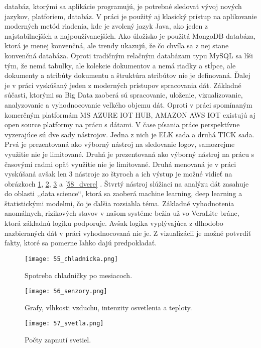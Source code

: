 databáz, ktorými sa aplikácie programujú, je potrebné sledovať vývoj nových jazykov, platforiem, databáz. V práci je použitý aj klasický prístup na aplikovanie moderných metód riadenia, kde je zvolený jazyk Java, ako jeden z najstabilnejších a najpoužívanejších. Ako úložisko je použitá MongoDB databáza, ktorá je menej konvenčná, ale trendy ukazujú, že čo chvíľa sa z nej stane konvenčná  databáza. Oproti tradičným relačným databázam typu MySQL sa líši tým, že nemá tabuľky, ale kolekcie dokumentov a nemá riadky a stĺpce, ale dokumenty a atribúty dokumentu a štruktúra atribútov nie je definovaná. Ďalej je v práci vyskúšaný jeden z moderných prístupov spracovania dát. Základné súčasti, ktorými sa Big Data zaoberá sú spracovanie, uloženie, vizualizovanie, analyzovanie a vyhodnocovanie veľkého objemu dát. Oproti v práci spomínaným komerčným platformám MS AZURE IOT HUB, AMAZON AWS IOT existujú aj open source platformy na prácu s dátami. V čase písania práce perspektívne vyzerajúce sú dve sady nástrojov. Jedna z nich je ELK \cite{IOT34} sada a druhá TICK \cite{IOT33} sada. Prvá je prezentovaná ako výborný nástroj na sledovanie logov, samozrejme využitie nie je limitované. Druhá je prezentovaná ako výborný nástroj na prácu s časovými radmi opäť využitie nie je limitované. Druhá menovaná je v práci vyskúšaná avšak len 3 nástroje zo štyroch a ich výstup je možné vidieť na obrázkoch \ref{55_chladnicka}, \ref{56_senzory}, \ref{57_svetla} a \ref{58_dvere} . Štvrtý nástroj slúžiaci na analýzu dát zasahuje do oblasti ,,data science``, ktorá sa zaoberá machine learning, deep learning a štatistickými modelmi, čo je ďalšia rozsiahla téma. Základné vyhodnotenia anomálnych, rizikových stavov v našom systéme bežia už vo VeraLite bráne, ktorá základnú logiku podporuje. Avšak logika vyplývajúca z dlhodobo nazbieraných dát v práci vyhodnocovaná nie je. Z vizualizácii je možné potvrdiť fakty, ktoré sa pomerne ľahko dajú predpokladať.

\begin{figure}[!htbp]
\centering
\texttt{[image: 55\_chladnicka.png]}
\caption{Spotreba chladničky po mesiacoch.}
\label{55_chladnicka}
\end{figure}

\begin{figure}[!htbp]
\centering
\texttt{[image: 56\_senzory.png]}
\caption{Grafy, vlhkosti vzduchu, intenzity osvetlenia a teploty.}
\label{56_senzory}
\end{figure}

\begin{figure}[!htbp]
\centering
\texttt{[image: 57\_svetla.png]}
\caption{Počty zapnutí svetiel.}
\label{57_svetla}
\end{figure}

